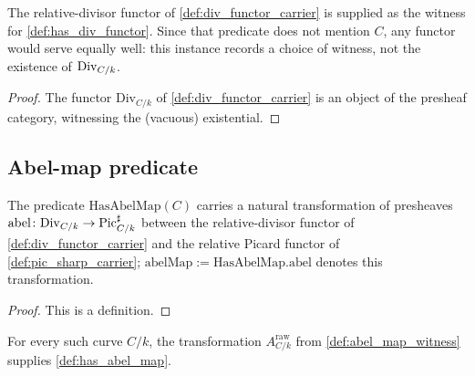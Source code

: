 \begin{definition}\leanok
  \label{def:inst_has_div_functor}
  The relative-divisor functor of \cref{def:div_functor_carrier} is supplied as
  the witness for \cref{def:has_div_functor}. Since that predicate does not
  mention \(C\), any functor would serve equally well: this instance records a
  choice of witness, not the existence of \(\operatorname{Div}_{C/k}\).
\end{definition}

\begin{proof}\leanok
  The functor \(\mathrm{Div}_{C/k}\) of \cref{def:div_functor_carrier} is an
  object of the presheaf category, witnessing the (vacuous) existential.
\end{proof}

\subsection{Abel-map predicate}
\label{subsec:fga_pic_abel_map_carrier}

\begin{definition}\leanok
  \label{def:has_abel_map}
  The predicate \(\mathrm{HasAbelMap}(C)\) carries a natural
  transformation of presheaves \(\mathrm{abel} \colon \mathrm{Div}_{C/k}
  \to \operatorname{Pic}^\sharp_{C/k}\) between the relative-divisor functor of
  \cref{def:div_functor_carrier} and the relative Picard functor of
  \cref{def:pic_sharp_carrier}; \(\mathrm{abelMap} :=
  \mathrm{HasAbelMap.abel}\) denotes this transformation.
\end{definition}

\begin{proof}
  This is a definition.
\end{proof}

\begin{definition}\leanok
  \label{def:inst_has_abel_map}
  For every such curve \(C/k\), the transformation
  \(A^{\mathrm{raw}}_{C/k}\) from \cref{def:abel_map_witness} supplies
  \cref{def:has_abel_map}.
\end{definition}

